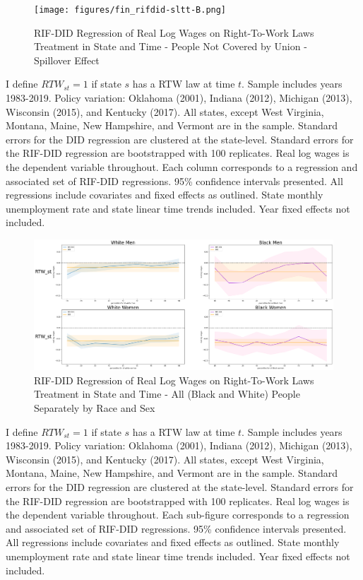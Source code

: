 \documentclass[11pt]{article}
\begin{document}
{\pagebreak
\begin{landscape}
\begin{figure}[ht!]
\centering
    \caption{RIF-DID Regression of Real Log Wages on Right-To-Work Laws Treatment in State and Time - People Not Covered by Union - Spillover Effect}\label{fig:rifdid-sltt-B}
    \texttt{[image: figures/fin\_rifdid-sltt-B.png]}
\end{figure}
\footnotesize{I define $RTW_{st} = 1$ if state $s$ has a RTW law at time $t$. Sample includes years 1983-2019. Policy variation: Oklahoma (2001), Indiana (2012), Michigan (2013), Wisconsin (2015), and Kentucky (2017). All states, except West Virginia, Montana, Maine, New Hampshire, and Vermont are in the sample. Standard errors for the DID regression are clustered at the state-level. Standard errors for the RIF-DID regression are bootstrapped with 100 replicates. Real log wages is the dependent variable throughout. Each column corresponds to a regression and associated set of RIF-DID regressions. 95\% confidence intervals presented. All regressions include covariates and fixed effects as outlined. State monthly unemployment rate and state linear time trends included. Year fixed effects not included.}
\end{landscape}

\pagebreak
\begin{landscape}
\begin{figure}[ht!]
\centering
    \caption{RIF-DID Regression of Real Log Wages on Right-To-Work Laws Treatment in State and Time - All (Black and White) People Separately by Race and Sex}\label{fig:rifdid-sltt-bw-A}
    \includegraphics[width=1.25\textwidth, height = \textheight, keepaspectratio]{figures/fin_rifdid-sltt-bw-A.png}
\end{figure}
\footnotesize{I define $RTW_{st} = 1$ if state $s$ has a RTW law at time $t$. Sample includes years 1983-2019. Policy variation: Oklahoma (2001), Indiana (2012), Michigan (2013), Wisconsin (2015), and Kentucky (2017). All states, except West Virginia, Montana, Maine, New Hampshire, and Vermont are in the sample. Standard errors for the DID regression are clustered at the state-level. Standard errors for the RIF-DID regression are bootstrapped with 100 replicates. Real log wages is the dependent variable throughout. Each sub-figure corresponds to a regression and associated set of RIF-DID regressions. 95\% confidence intervals presented. All regressions include covariates and fixed effects as outlined. State monthly unemployment rate and state linear time trends included. Year fixed effects not included.}
\end{landscape}

}
\end{document}

